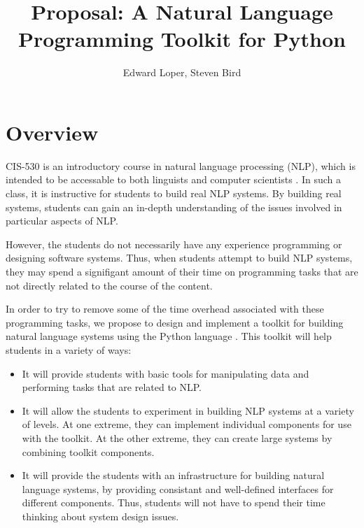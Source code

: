 \documentclass{article}
\begin{document}
\title{Proposal: A Natural Language Programming Toolkit for Python}
\author{Edward Loper, Steven Bird}
\maketitle

\section{Overview}

CIS-530 is an introductory course in natural language processing
(NLP), which is intended to be accessable to both linguists and
computer scientists \cite{cis530}. In such a class, it is instructive
for students to build real NLP systems.  By building real systems,
students can gain an in-depth understanding of the issues involved in
particular aspects of NLP.

However, the students do not necessarily have any experience
programming or designing software systems.  Thus, when students
attempt to build NLP systems, they may spend a signifigant amount of
their time on programming tasks that are not directly related to the
course of the content.

In order to try to remove some of the time overhead associated with
these programming tasks, we propose to design and implement a toolkit
for building natural language systems using the Python
language \cite{python}. This toolkit will help students in a variety
of ways:

\begin{itemize}
  \item It will provide students with basic tools for manipulating
  data and performing tasks that are related to NLP.

  \item It will allow the students to experiment in building NLP
  systems at a variety of levels.  At one extreme, they can implement
  individual components for use with the toolkit.  At the other
  extreme, they can create large systems by combining toolkit
  components.

  \item It will provide the students with an infrastructure for
  building natural language systems, by providing consistant and
  well-defined interfaces for different components.  Thus, students
  will not have to spend their time thinking about system design
  issues.
\end{itemize}
\end{document}
